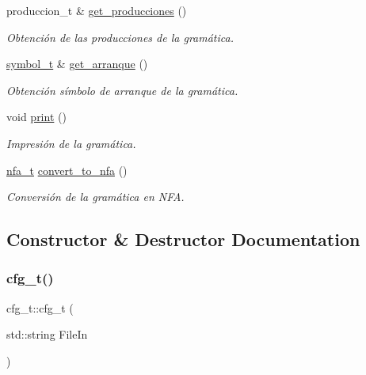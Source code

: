 \begin{DoxyCompactItemize}
produccion\+\_\+t \& \hyperlink{classcfg__t_ab9208ef8e4ccc3ee5d9abf06720a4e28}{get\+\_\+producciones} ()
\begin{DoxyCompactList}\small\item\em Obtención de las producciones de la gramática. \end{DoxyCompactList}\item 
\hyperlink{classsymbol__t}{symbol\+\_\+t} \& \hyperlink{classcfg__t_aff31718cb0d5f8ae65d3a53ba4065f2e}{get\+\_\+arranque} ()
\begin{DoxyCompactList}\small\item\em Obtención símbolo de arranque de la gramática. \end{DoxyCompactList}\item 
\mbox{\label{classcfg__t_a8742d8a8f0fd07f0d2a2519df40db71b}} 
void \hyperlink{classcfg__t_a8742d8a8f0fd07f0d2a2519df40db71b}{print} ()
\begin{DoxyCompactList}\small\item\em Impresión de la gramática. \end{DoxyCompactList}\item 
\hyperlink{classnfa__t}{nfa\+\_\+t} \hyperlink{classcfg__t_abda1afb6ae53b0b40a39d84176aab3b8}{convert\+\_\+to\+\_\+nfa} ()
\begin{DoxyCompactList}\small\item\em Conversión de la gramática en N\+FA. \end{DoxyCompactList}\end{DoxyCompactItemize}


\subsection{Constructor \& Destructor Documentation}
\mbox{\label{classcfg__t_a3a78057122dddd7d1fd860bed69fca34}} 
\subsubsection{\texorpdfstring{cfg\+\_\+t()}{cfg\_t()}}
{\footnotesize\ttfamily cfg\+\_\+t\+::cfg\+\_\+t (\begin{DoxyParamCaption}\item[{std\+::string}]{File\+In }\end{DoxyParamCaption})}



